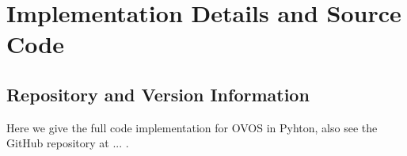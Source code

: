 \chapter{Implementation Details and Source Code}
\label{appc:code}

\section{Repository and Version Information}



Here we give the full code implementation for OVOS in Pyhton, also see the GitHub repository at ... .


